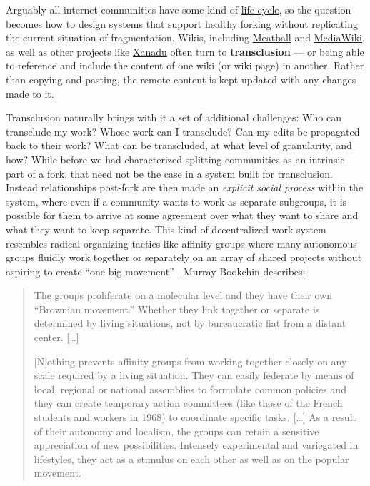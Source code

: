 Arguably all internet communities have some kind of
\href{http://meatballwiki.org/wiki/WikiLifeCycle}{life cycle}, so the
question becomes how to design systems that support healthy forking
without replicating the current situation of fragmentation. Wikis,
including \href{http://www.meatballwiki.org/wiki/TransClusion}{Meatball}
and
\href{https://www.mediawiki.org/wiki/Extension:Interwiki}{MediaWiki}, as
well as other projects like
\href{https://en.wikipedia.org/wiki/Project_Xanadu}{Xanadu} often turn
to \textbf{transclusion} --- or being able to reference and include the
content of one wiki (or wiki page) in another. Rather than copying and
pasting, the remote content is kept updated with any changes made to it.

Transclusion naturally brings with it a set of additional challenges:
Who can transclude my work? Whose work can I transclude? Can my edits be
propagated back to their work? What can be transcluded, at what level of
granularity, and how? While before we had characterized splitting
communities as an intrinsic part of a fork, that need not be the case in
a system built for transclusion. Instead relationships post-fork are
then made an \emph{explicit social process} within the system, where
even if a community wants to work as separate subgroups, it is possible
for them to arrive at some agreement over what they want to share and
what they want to keep separate. This kind of decentralized work system
resembles radical organizing tactics like affinity groups where many
autonomous groups fluidly work together or separately on an array of
shared projects without aspiring to create ``one big movement'' \citep{kleinWereDCSeattle2001} . Murray Bookchin describes:

\begin{quote}
The groups proliferate on a molecular level and they have their own
``Brownian movement.'' Whether they link together or separate is
determined by living situations, not by bureaucratic fiat from a distant
center. {[}\ldots{]}

{[}N{]}othing prevents affinity groups from working together closely on
any scale required by a living situation. They can easily federate by
means of local, regional or national assemblies to formulate common
policies and they can create temporary action committees (like those of
the French students and workers in 1968) to coordinate specific tasks.
{[}\ldots{]} As a result of their autonomy and localism, the groups can
retain a sensitive appreciation of new possibilities. Intensely
experimental and variegated in lifestyles, they act as a stimulus on
each other as well as on the popular movement. \citep{bookchinNoteAffinityGroups1969} 
\end{quote}

